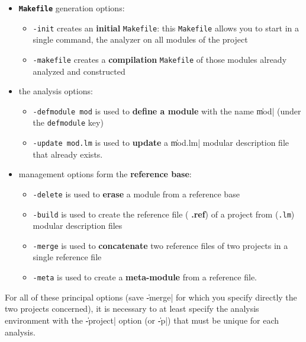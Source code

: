 \begin{itemize}
\item {{\bf {\tt Makefile}} generation options:}
\begin{itemize}
\item {\tt -init} creates an {\bf initial} {\tt Makefile}: this {\tt Makefile} allows you to start in a single command, the analyzer on all modules of the project

\item {\tt -makefile} creates a {\bf compilation} {\tt Makefile} of those modules already analyzed and constructed 
\end{itemize}

\item {the analysis options}:
\begin{itemize}
\item {\tt -defmodule mod} is used to {\bf define a module} with the name \|mod| (under the {\tt defmodule} key)

\item {\tt -update mod.lm} is used to {\bf update} a \|mod.lm| modular description file that already exists.  
\end{itemize}

\item {management options form the {\bf reference base}:}
\begin{itemize}
\item {\tt -delete} is used to {\bf erase} a module from a reference base

\item {\tt -build} is used to create the reference file ({\bf
.ref}) of a project from ({\tt .lm}) modular description files

\item {\tt -merge} is used to {\bf concatenate} two reference files of two projects in a single reference file

\item {\tt -meta} is used to create a {\bf meta-module} from a reference file.
\end{itemize}
\end{itemize}

For all of these principal options (save \|-merge| for which you specify directly the two projects concerned), it is necessary to at least specify the analysis environment with the \|-project| option (or \|-p|) that must be unique for each analysis.

